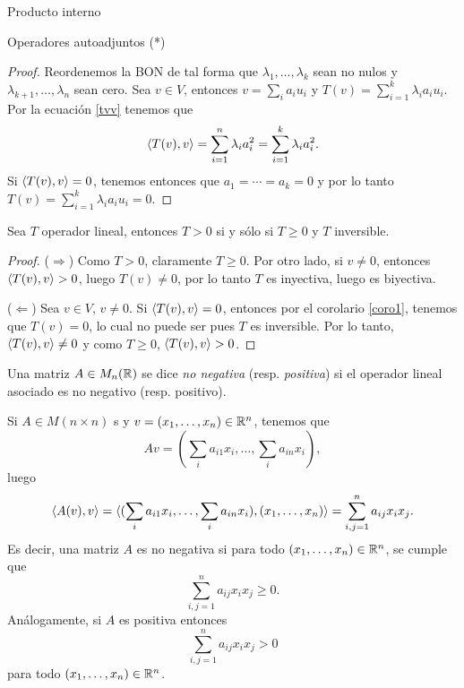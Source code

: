\begin{chapter}{Producto interno}
\begin{section}{Operadores autoadjuntos (*)}
\begin{proof}
            Reordenemos la BON de tal forma que $\lambda_1,\ldots,\lambda_k$ sean no nulos y   $\lambda_{k+1},\ldots,\lambda_n$ sean cero. Sea $v \in V$, entonces $v = \sum_i a_i u_i$ y $T(v) = \sum_{i=1}^k \lambda_ia_i u_i$.  Por la ecuación \eqref{tvv} tenemos  que 
            $$
            \langle T(v),v \rangle  = \sum_{i=1}^n\lambda_i a_i^2 = \sum_{i=1}^k\lambda_i a_i^2.
            $$
            Si $\langle T(v),v \rangle  = 0$, tenemos entonces que $a_1= \cdots=a_k =0$ y por lo tanto $T(v) = \sum_{i=1}^k \lambda_ia_i u_i = 0$.
            
        
        \end{proof}
        
        
        \begin{corolario}
            Sea $T$ operador lineal, entonces $T > 0$ si y sólo si $T \ge 0$ y $T$ inversible. 
        \end{corolario}
        \begin{proof}
            ($\Rightarrow$) Como $T>0$, claramente $T \ge 0$. Por otro lado, si $v \ne 0$, entonces $\langle T(v), v \rangle > 0$, luego $T(v) \ne 0$, por lo tanto $T$ es inyectiva, luego es biyectiva.

            ($\Leftarrow$)  Sea $v \in V$, $v\not=0$. Si $\langle T(v), v \rangle = 0$,  entonces por el corolario \ref{coro1}, tenemos que $T(v)=0$, lo cual no puede ser pues $T$ es inversible. Por lo tanto, $\langle T(v), v \rangle \ne 0$ y como  $T\ge 0$, $\langle T(v), v \rangle > 0$.
        \end{proof}
        
        
        
        \begin{definicion}
            Una matriz $A \in  M_{n}(\mathbb R)$ se dice \textit{no negativa} (resp. \textit{positiva}) si el operador lineal asociado es no negativo (resp. positivo).  
        \end{definicion}
        
        Si  $A \in M(n \times n)$ s y $v=(x_1,\ldots,x_n) \in \mathbb R^n$, tenemos que 
        $$
        Av = (\sum_i a_{i1}x_i,\ldots, \sum_i a_{in}x_i),
        $$
        luego 
        $$
        \langle A(v), v\rangle = \langle  (\sum_i a_{i1}x_i,\ldots, \sum_i a_{in}x_i),(x_1,\ldots,x_n)\rangle =  \sum_{i,j=1}^n a_{ij}x_ix_j.
        $$
        Es  decir, una matriz $A$ es no negativa si para todo $(x_1,\ldots,x_n) \in \mathbb R^n$, se cumple que
        $$
         \sum_{i,j=1}^n a_{ij}x_ix_j \ge 0.
        $$
        Análogamente, si $A$ es positiva entonces 
        $$
         \sum_{i,j=1}^n a_{ij}x_ix_j > 0
        $$
        para todo $(x_1,\ldots,x_n) \in \mathbb R^n$.
        

\end{section}
\end{chapter}
